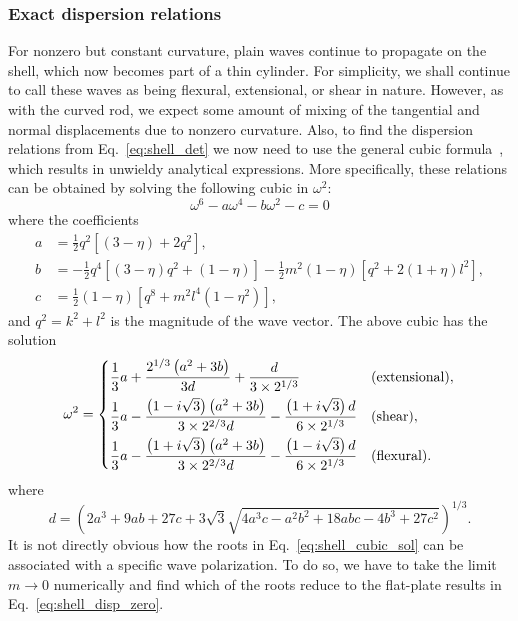 \subsubsection*{Exact dispersion relations}

For nonzero but constant curvature, plain waves continue to propagate on the shell, which now becomes part of a thin cylinder.
For simplicity, we shall continue to call these waves as being flexural, extensional, or shear in nature.
However, as with the curved rod, we expect some amount of mixing of the tangential and normal displacements due to nonzero curvature.
Also, to find the dispersion relations from Eq.~\eqref{eq:shell_det} we now need to use the general cubic formula~\cite{olver2010}, which results in unwieldy analytical expressions.
More specifically, these relations can be obtained by solving the following cubic in $\omega^{2}$:
%
\begin{equation}
  \omega^{6} - a\omega^{4} - b\omega^{2} - c = 0
\end{equation}
%
where the coefficients
%
\begin{equation}
  \begin{aligned}
    a &= \frac{1}{2}q^{2}\left[(3 - \eta) + 2q^{2}\right],\\
    b &= -\frac{1}{2}q^{4}\left[(3 - \eta)q^{2} + (1 - \eta)\right] - \frac{1}{2}m^{2}(1 - \eta)\left[q^{2} + 2(1 + \eta)l^{2}\right],\\
    c &= \frac{1}{2}(1-\eta)\left[q^{8} + m^{2}l^{4}\left(1 - \eta^{2}\right)\right],
  \end{aligned}
\end{equation}
%
and $q^{2} = k^{2} + l^{2}$ is the magnitude of the wave vector.
The above cubic has the solution
%
\begin{equation}
  \omega^{2} =
  \begin{dcases}
    \frac{1}{3}a + \frac{2^{1/3}\left(a^{2} + 3b\right)}{3d} + \frac{d}{3\times2^{1/3}} & \text{(extensional)},\\
    \frac{1}{3}a - \frac{\left(1 - i\sqrt{3}\right)\left(a^{2} + 3b\right)}{3\times2^{2/3}d} - \frac{\left(1 + i\sqrt{3}\right)d}{6\times2^{1/3}} & \text{(shear)},\\
    \frac{1}{3}a - \frac{\left(1 + i\sqrt{3}\right)\left(a^{2} + 3b\right)}{3\times2^{2/3}d} - \frac{\left(1 - i\sqrt{3}\right)d}{6\times2^{1/3}} & \text{(flexural)}.\\
  \end{dcases}
  \label{eq:shell_cubic_sol}
\end{equation}
%
where
%
\begin{equation}
  d = \left(2 a^3+9 a b+27 c+3 \sqrt{3}\sqrt{4 a^3 c-a^2 b^2+18 a b c-4 b^3+27 c^2}\right)^{1/3}.
\end{equation}
%
It is not directly obvious how the roots in Eq.~\eqref{eq:shell_cubic_sol} can be associated with a specific wave polarization.
To do so, we have to take the limit $m \to 0$ numerically and find which of the roots reduce to the flat-plate results in Eq.~\eqref{eq:shell_disp_zero}.

